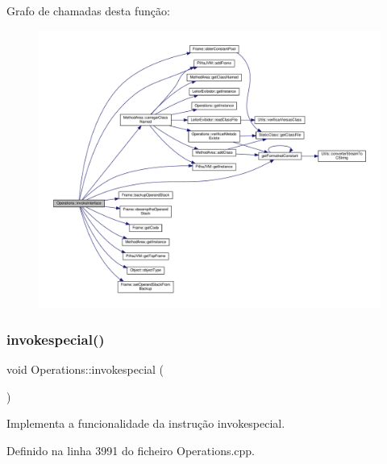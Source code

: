 Grafo de chamadas desta função\+:
\nopagebreak
\begin{figure}[H]
\begin{center}
\leavevmode
\includegraphics[width=350pt]{classOperations_a9206595fad5d3ac24514b2dfd6a013da_cgraph}
\end{center}
\end{figure}
\mbox{\label{classOperations_ab561e27c8450ceec7e4f8b0a155fcda3}} 
\subsubsection{\texorpdfstring{invokespecial()}{invokespecial()}}
{\footnotesize\ttfamily void Operations\+::invokespecial (\begin{DoxyParamCaption}{ }\end{DoxyParamCaption})\hspace{0.3cm}{\ttfamily [private]}}



Implementa a funcionalidade da instrução invokespecial. 



Definido na linha 3991 do ficheiro Operations.\+cpp.



